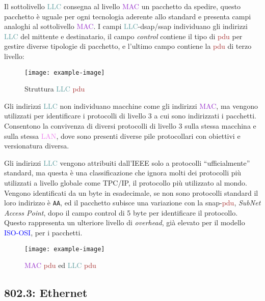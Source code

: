 \documentclass{article}
\numberwithin{equation}{subsection}
\begin{document}
Il sottolivello \textcolor{CadetBlue}{LLC} consegna al livello \textcolor{DarkOrchid}{MAC} un pacchetto da spedire, questo pacchetto è uguale per ogni tecnologia aderente allo standard e presenta campi analoghi al sottolivello \textcolor{DarkOrchid}{MAC}. I campi \textcolor{CadetBlue}{LLC}-dsap/ssap individuano 
gli indirizzi \textcolor{CadetBlue}{LLC} del mittente e destinatario, il campo \textit{control} contiene il tipo di \textcolor{Brown}{pdu} per gestire diverse tipologie di pacchetto, e l'ultimo campo contiene la \textcolor{Brown}{pdu} di terzo livello: 

\begin{figure}[H]%
    \centering%
    \texttt{[image: example-image]}%
    \caption{Struttura \textcolor{CadetBlue}{LLC} \textcolor{Brown}{pdu}}%
\end{figure}

Gli indirizzi \textcolor{CadetBlue}{LLC} non individuano macchine come gli indirizzi \textcolor{DarkOrchid}{MAC}, ma vengono utilizzati per identificare i protocolli di livello 3 a cui sono indirizzati i pacchetti. Consentono la convivenza di diversi protocolli 
di livello 3 sulla stessa macchina e sulla stessa \textcolor{violet}{LAN}, dove sono presenti diverse pile protocollari con obiettivi e versionatura diversa. 

Gli indirizzi \textcolor{CadetBlue}{LLC} vengono attribuiti dall'IEEE solo a protocolli ``ufficialmente'' standard, ma questa è una classificazione che ignora molti dei protocolli più utilizzati a livello globale come \textcolor{Bittersweet}{TPC}/\textcolor{Bittersweet}{IP}, il 
protocollo più utilizzato al mondo. Vengono identificati da un byte in esadecimale, se non sono protocolli standard il loro indirizzo è \verb|AA|, ed il pacchetto subisce una variazione con la snap-\textcolor{Brown}{pdu}, 
\textit{SubNet Access Point}, dopo il campo control di 5 byte per identificare il protocollo. Questo rappresenta un ulteriore livello di \textit{overhead}, già elevato per il modello \textcolor{blue}{ISO-OSI}, per i pacchetti. 

\begin{figure}[H]%
    \centering%
    \texttt{[image: example-image]}%
    \caption{\textcolor{DarkOrchid}{MAC} \textcolor{Brown}{pdu} ed \textcolor{CadetBlue}{LLC} \textcolor{Brown}{pdu}}%
\end{figure}

\subsection{802.3: Ethernet}
\label{sec:ieee_802.3}
\end{document}
